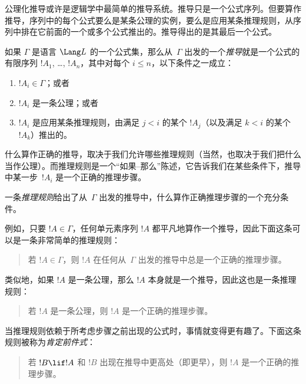 \documentclass[../../../include/open-logic-section]{subfiles}
\begin{document}
      {}
      {}


\begin{explain}
  公理化推导或许是逻辑学中最简单的推导系统。推导只是一个公式序列。但要算作推导，序列中的每个公式要么是某条公理的实例，要么是应用某条推理规则，从序列中排在它前面的一个或多个公式推出的。推导得出的是其最后一个公式。
\end{explain}

\begin{defn}[推导]
如果 $\Gamma$ 是语言 $\Lang L$ 的一个公式集，那么从~$\Gamma$ 出发的一个\emph{推导}就是一个公式的有限序列 $!A_1$, \dots, $!A_n$，其中对每个 $i \le n$，以下条件之一成立：
\begin{enumerate}
\item $!A_i \in \Gamma$；或者
\item $!A_i$ 是一条公理；或者
\item $!A_i$ 是应用某条推理规则，由满足 $j < i$ 的某个 $!A_j$（以及满足 $k < i$ 的某个 $!A_k$）推出的。
\end{enumerate}
\end{defn}

什么算作正确的推导，取决于我们允许哪些推理规则（当然，也取决于我们把什么当作公理）。而推理规则是一个“如果–那么”陈述，它告诉我们在某些条件下，推导中某一步~$!A_i$ 是一个正确的推理步骤。

\begin{defn}[推理规则]
一条\emph{推理规则}给出了从~$\Gamma$ 出发的推导中，什么算作正确推理步骤的一个充分条件。
\end{defn}

例如，只要 $!A \in \Gamma$，任何单元素序列 $!A$ 都平凡地算作一个推导，因此下面这条可以是一条非常简单的推理规则：

\begin{quote}
  若 $!A \in \Gamma$，则 $!A$ 在任何从~$\Gamma$ 出发的推导中总是一个正确的推理步骤。
\end{quote}

类似地，如果 $!A$ 是一条公理，那么 $!A$ 本身就是一个推导，因此这也是一条推理规则：

\begin{quote}
  若 $!A$ 是一条公理，则 $!A$ 是一个正确的推理步骤。
\end{quote}

当推理规则依赖于所考虑步骤之前出现的公式时，事情就变得更有趣了。下面这条规则被称为\emph{肯定前件式}：

\begin{quote}
  若 $!B \lif !A$ 和 $!B$ 出现在推导中更高处（即更早），则 $!A$ 是一个正确的推理步骤。
\end{quote}
\end{document}

